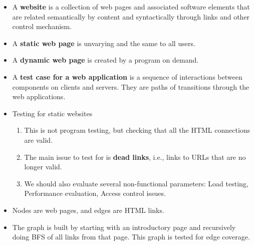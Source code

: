 \documentclass[a4paper]{article}
\begin{document}
\begin{itemize}
    \item A \textbf{website} is a collection of web pages and associated software elements that are related semantically by content and syntactically through links and other control mechanism.
    \item A \textbf{static web page} is unvarying and the same to all users.
    \item A \textbf{dynamic web page} is created by a program on demand.
    \item A \textbf{test case for a web application} is a sequence of interactions between components on clients and servers. They are paths of transitions through the web applications.
    \item Testing for static websites
    \begin{enumerate}
        \item This is not program testing, but checking that all the HTML connections are valid.
        \item The main issue to test for is \textbf{dead links}, i.e., links to URLs that are no longer valid.
        \item We should also evaluate several non-functional parameters: Load testing, Performance evaluation, Access control issues.
    \end{enumerate}
    \item Nodes are web pages, and edges are HTML links.
    \item The graph is built by starting with an introductory page and recursively doing BFS of all links from that page. This graph is tested for edge coverage.
\end{itemize}
\end{document}
